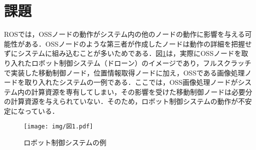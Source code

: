 \documentclass[11pt]{ujarticle} %
\begin{document}
\section{課題}
ROSでは，OSSノードの動作がシステム内の他のノードの動作に影響を与える可能性がある．OSSノードのような第三者が作成したノードは動作の詳細を把握せずにシステムに組み込むことが多いためである．図\ref{fig:before}は，実際にOSSノードを取り入れたロボット制御システム（ドローン）のイメージであり，フルスクラッチで実装した移動制御ノード，位置情報取得ノードに加え，OSSである画像処理ノードを取り入れたシステムの一例である．ここでは，OSS画像処理ノードがシステム内の計算資源を専有してしまい，その影響を受けた移動制御ノードは必要分の計算資源を与えられていない．そのため，ロボット制御システムの動作が不安定になっている．

\begin{figure}[h]
   \centering
   \texttt{[image: img/図1.pdf]}
   \caption{ロボット制御システムの例}
   \label{fig:before}
\end{figure}

\end{document}
